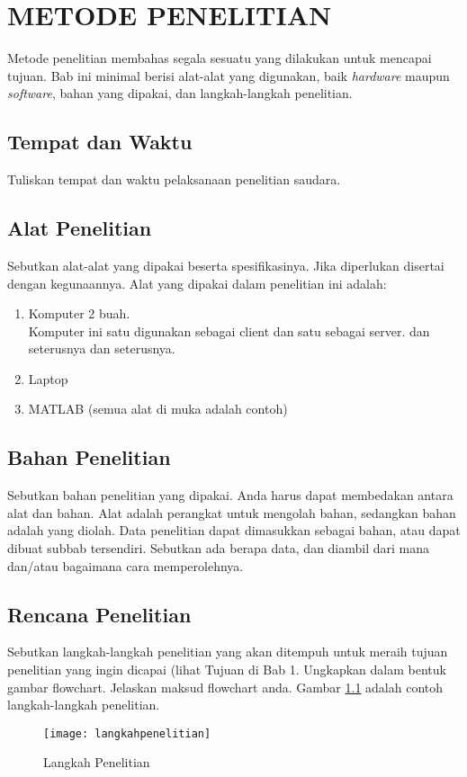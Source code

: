 \chapter{\uppercase{metode penelitian}} \label{metode_penelitian}
Metode penelitian membahas segala sesuatu yang dilakukan untuk mencapai tujuan. Bab ini minimal berisi alat-alat yang digunakan, baik \textit{hardware} maupun \textit{software}, bahan yang dipakai, dan langkah-langkah penelitian.

\section{Tempat dan Waktu}
Tuliskan tempat dan waktu pelaksanaan penelitian saudara.

\section{Alat Penelitian}
Sebutkan alat-alat yang dipakai beserta spesifikasinya. Jika diperlukan disertai dengan kegunaannya. Alat yang dipakai dalam penelitian ini adalah:
\begin{enumerate}
	\item Komputer 2 buah.\\
	Komputer ini satu digunakan sebagai client dan satu sebagai server. dan seterusnya dan seterusnya.
	\item Laptop
	\item MATLAB (semua alat di muka adalah contoh)
\end{enumerate}

\section{Bahan Penelitian}
Sebutkan bahan penelitian yang dipakai. Anda harus dapat membedakan antara alat dan bahan. Alat adalah perangkat untuk mengolah bahan, sedangkan bahan adalah yang diolah. Data penelitian dapat dimasukkan sebagai bahan, atau dapat dibuat subbab tersendiri. Sebutkan ada berapa data, dan diambil dari mana dan/atau bagaimana cara memperolehnya.

\section{Rencana Penelitian}
Sebutkan langkah-langkah penelitian yang akan ditempuh untuk meraih tujuan penelitian yang ingin dicapai (lihat Tujuan di Bab 1. Ungkapkan dalam bentuk gambar flowchart. Jelaskan maksud flowchart anda. Gambar \ref{langkahpenelitian} adalah contoh langkah-langkah penelitian.
	\begin{figure}
		\centering
		\texttt{[image: langkahpenelitian]}
		\caption{Langkah Penelitian}
		\label{langkahpenelitian}
	\end{figure}
	
